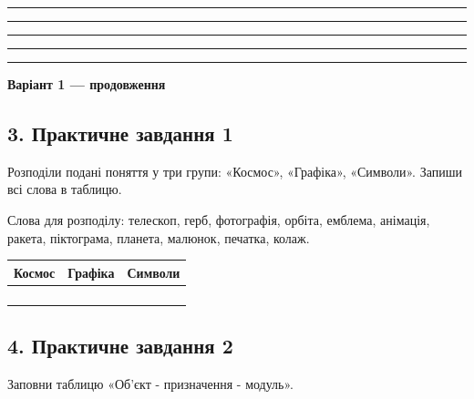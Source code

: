 \documentclass[11pt,a4paper]{article}
\begin{document}
\rule{0.96\linewidth}{0.4pt}\par

\rule{0.96\linewidth}{0.4pt}\par

\rule{0.96\linewidth}{0.4pt}\par

\rule{0.96\linewidth}{0.4pt}\par

\rule{0.96\linewidth}{0.4pt}\par

\newpage\textbf{Варіант 1 — продовження}\par

\subsection*{3. Практичне завдання 1}

Розподіли подані поняття у три групи: «Космос», «Графіка», «Символи». Запиши всі слова в таблицю.\par

Слова для розподілу: телескоп, герб, фотографія, орбіта, емблема, анімація, ракета, піктограма, планета, малюнок, печатка, колаж.\par

\begin{tabularx}{\linewidth}{|>{\raggedright\arraybackslash}X|>{\raggedright\arraybackslash}X|>{\raggedright\arraybackslash}X|}\hline

\textbf{Космос} & \textbf{Графіка} & \textbf{Символи} \\ \hline

 &  &  \\ \hline

 &  &  \\ \hline

 &  &  \\ \hline

 &  &  \\ \hline

\end{tabularx}\par

\subsection*{4. Практичне завдання 2}

Заповни таблицю «Об'єкт - призначення - модуль».\par
\end{document}
